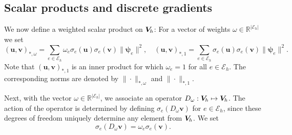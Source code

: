 \documentclass[11pt]{amsart}
\numberwithin{equation}{section}
\theoremstyle{definition}\newtheorem{example}{Example}[section]
\begin{document}
\subsection{Scalar products and discrete gradients}
We now define a weighted scalar product on ${{\boldsymbol V}_{\hspace{-0.2mm}h}}$: For a vector of
weights $\omega\in \mathbb{R}^{|\mathcal{E}_h|}$ we set
\[
({{\mathbf u}},{{\mathbf v}})_{*,\omega} = \sum_{e\in \mathcal{E}_h} 
\omega_{e}\sigma_{e}({{\mathbf u}}) \sigma_{e}({{\mathbf v}})\| {{\boldsymbol \psi}}_e\|^2, \quad
({{\mathbf u}},{{\mathbf v}})_{*,1} = \sum_{e\in \mathcal{E}_h} 
\sigma_{e}({{\mathbf u}}) \sigma_{e}({{\mathbf v}})\|{{\boldsymbol \psi}}_e\|^2.
\]
Note that $({{\mathbf u}},{{\mathbf v}})_{*,1}$ is an inner product for which
$\omega_e=1$ for all $e\in \mathcal{E}_h$. The corresponding norms are
denoted by $\|\cdot\|_{*,\omega}$ and $\|\cdot\|_{*,1}$. 

Next, with the vector $\omega\in \mathbb{R}^{|\mathcal{E}_h|}$, we
associate an operator $D_{\omega}:{{\boldsymbol V}_{\hspace{-0.2mm}h}}\mapsto {{\boldsymbol V}_{\hspace{-0.2mm}h}}$. The
action of the operator is determined by defining
$\sigma_e(D_{\omega}{{\mathbf v}})$ for $e\in \mathcal{E}_h$, since these
degrees of freedom uniquely determine any element from ${{\boldsymbol V}_{\hspace{-0.2mm}h}}$. We
set
\begin{equation}\label{eq:operator}
\sigma_e(D_{\omega} {{\mathbf v}}) = \omega_e\sigma_e({{\mathbf v}}). 
\end{equation}
\end{document}
